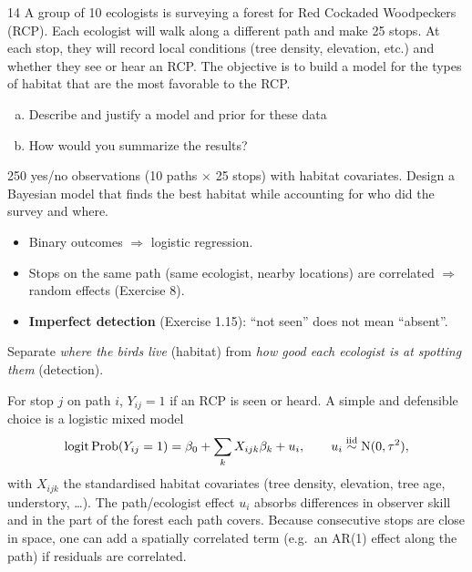 \documentclass[11pt]{article}
\begin{document}
\begin{problem}{14}
A group of 10 ecologists is surveying a forest for Red Cockaded Woodpeckers (RCP). Each ecologist will walk along a different path and make 25 stops. At each stop, they will record local conditions (tree density, elevation, etc.) and whether they see or hear an RCP. The objective is to build a model for the types of habitat that are the most favorable to the RCP.
\begin{enumerate}[(a)]
\item Describe and justify a model and prior for these data
\item How would you summarize the results?
\end{enumerate}
\end{problem}

\begin{restate}
250 yes/no observations (10 paths $\times$ 25 stops) with habitat covariates. Design a Bayesian model that finds the best habitat while accounting for who did the survey and where.
\end{restate}

\begin{recall}
\begin{itemize}
\item Binary outcomes $\Rightarrow$ logistic regression.
\item Stops on the same path (same ecologist, nearby locations) are correlated $\Rightarrow$ random effects (Exercise 8).
\item \textbf{Imperfect detection} (Exercise 1.15): ``not seen'' does not mean ``absent''.
\end{itemize}
\end{recall}

\begin{keyidea}
Separate \emph{where the birds live} (habitat) from \emph{how good each ecologist is at spotting them} (detection).
\end{keyidea}

\solution
{} For stop $j$ on path $i$, $Y_{ij}=1$ if an RCP is seen or heard. A simple and defensible choice is a logistic mixed model
\[
\mathrm{logit}\,\mathrm{Prob}(Y_{ij}=1)=\beta_0+\sum_k X_{ijk}\beta_k+u_i,\qquad u_i\stackrel{\text{iid}}{\sim}\mathrm{N}(0,\tau^2),
\]
with $X_{ijk}$ the standardised habitat covariates (tree density, elevation, tree age, understory, \ldots). The path/ecologist effect $u_i$ absorbs differences in observer skill and in the part of the forest each path covers. Because consecutive stops are close in space, one can add a spatially correlated term (e.g.\ an AR(1) effect along the path) if residuals are correlated.
\end{document}
